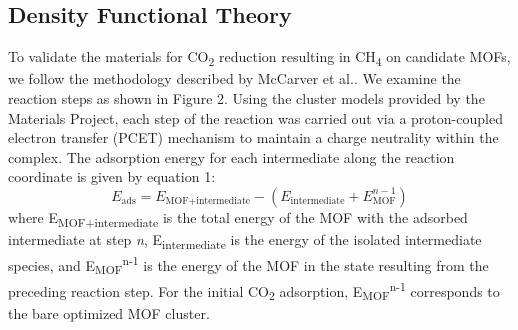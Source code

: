 \documentclass[twoside,twocolumn,9pt]{article}
\begin{document}
\subsection{Density Functional Theory}



To validate the materials for CO\textsubscript{2} reduction resulting in CH\textsubscript{4} on candidate MOFs, we follow the methodology described by McCarver et al.\cite{mccarver_catalyst_2023}. We examine the reaction steps as shown in Figure 2. Using the cluster models provided by the Materials Project, each step of the reaction was carried out via a proton-coupled electron transfer (PCET) mechanism to maintain a charge neutrality within the complex\cite{verma_mechanism_2015}. The adsorption energy for each intermediate along the reaction coordinate is given by equation 1:
\begin{equation}E_{\text{ads}} = E_{\text{MOF+intermediate}} - (E_{\text{intermediate}} + E_{\text{MOF}}^{n-1})\end{equation}
where E\textsubscript{MOF+intermediate} is the total energy of the MOF with the adsorbed intermediate at step \textit{n}, E\textsubscript{intermediate} is the energy of the isolated intermediate species, and E\textsubscript{MOF}\textsuperscript{n-1} is the energy of the MOF in the state resulting from the preceding reaction step. For the initial CO\textsubscript{2} adsorption, E\textsubscript{MOF}\textsuperscript{n-1} corresponds to the bare optimized MOF cluster.

\par
\end{document}
